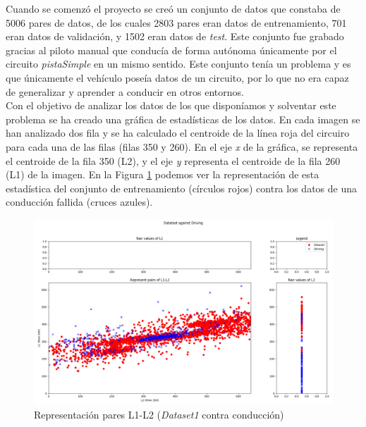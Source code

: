 Cuando se comenzó el proyecto se creó un conjunto de datos que constaba de 5006 pares de datos, de los cuales 2803 pares eran datos de entrenamiento, 701 eran datos de validación, y 1502 eran datos de \textit{test}. Este conjunto fue grabado gracias al piloto manual que conducía de forma autónoma únicamente por el circuito \textit{pistaSimple} en un mismo sentido. Este conjunto tenía un problema y es que únicamente el vehículo poseía datos de un circuito, por lo que no era capaz de generalizar y aprender a conducir en otros entornos.\\

Con el objetivo de analizar los datos de los que disponíamos y solventar este problema se ha creado una gráfica de estadísticas de los datos. En cada imagen se han analizado dos fila y se ha calculado el centroide de la línea roja del circuiro para cada una de las filas (filas 350 y 260). En el eje \textit{x} de la gráfica, se representa el centroide de la fila 350 (L2), y el eje \textit{y} representa el centroide de la fila 260 (L1) de la imagen. En la Figura \ref{fig.L1_L2_dataset1} podemos ver la representación de esta estadística del conjunto de entrenamiento (círculos rojos) contra los datos de una conducción fallida (cruces azules).\\


\begin{figure}[H]
  \begin{center}
    \includegraphics[width=1\textwidth]{figures/Infraestructura/L1_L2_dataset1_driving.png}
		\caption{Representación pares L1-L2 (\textit{Dataset1} contra conducción)}
		\label{fig.L1_L2_dataset1}
		\end{center}
\end{figure}


